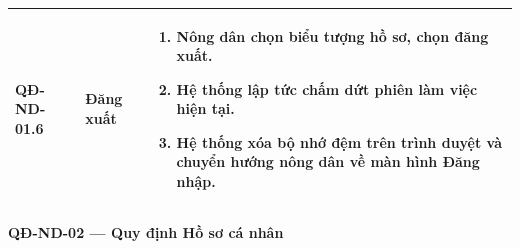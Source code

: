 \documentclass[12pt,a4paper]{article}
\begin{document}
\begin{longtable}{|
        >{\raggedright\arraybackslash}p{2.2cm}|
        >{\raggedright\arraybackslash}p{2.8cm}|
        >{\raggedright\arraybackslash}p{9.8cm}|}
    \hline
    \textbf{QĐ-ND-01.6}  & \textbf{Đăng xuất}                   &
    \begin{enumerate}[leftmargin=*,topsep=2pt,itemsep=1pt]
        \item  Nông dân chọn biểu tượng hồ sơ, chọn đăng xuất.
        \item Hệ thống lập tức chấm dứt phiên làm việc hiện tại.
        \item Hệ thống xóa bộ nhớ đệm trên trình duyệt và chuyển hướng nông dân về màn hình Đăng nhập.
    \end{enumerate}                                                                                                                                                                                                                    \\
    \hline
\end{longtable}

\vspace{0.3cm}
\noindent\textbf{QĐ-ND-02 --- Quy định Hồ sơ cá nhân}
\end{document}
